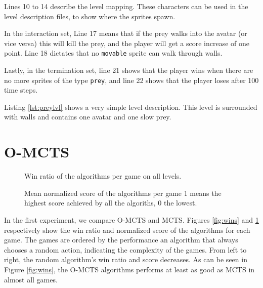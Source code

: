 Lines 10 to 14 describe the level mapping. These characters can be used in the
level description files, to show where the sprites spawn. 

In the interaction set, Line 17 means that if the prey walks into the avatar (or
vice versa) this will kill the prey, and the player will get a score increase of
one point. Line 18 dictates that no \texttt{movable} sprite can walk through
walls.

Lastly, in the termination set, line 21 shows that the player wins when there
are no more sprites of the type \texttt{prey}, and line 22 shows that the player
loses after 100 time steps.

Listing \ref{lst:preylvl} shows a very simple level description. This level is
surrounded with walls and contains one avatar and one slow prey. 

\section{O-MCTS}
\label{subsec:omcts}
\begin{figure}
	\centering
	\vspace{-.8cm}
	\caption{Win ratio of the algorithms per game on all levels.}
	\label{fig:wins}
	\centering
	\vspace{-.8cm}
	\caption{Mean normalized score of the algorithms per game 1 means the
	highest score achieved by all the algoriths, 0 the lowest.}
	\label{fig:scores}
\end{figure}

In the first experiment, we compare O-MCTS and MCTS. Figures \ref{fig:wins} and
\ref{fig:scores} respectively show the win ratio and normalized score of the
algorithms for each game. The games are ordered by the performance an algorithm
that always chooses a random action, indicating the complexity of the games.
From left to right, the random algorithm's win ratio and score decreases. As can
be seen in Figure \ref{fig:wins}, the O-MCTS algorithms performs at least as
good as MCTS in almost all games. 

